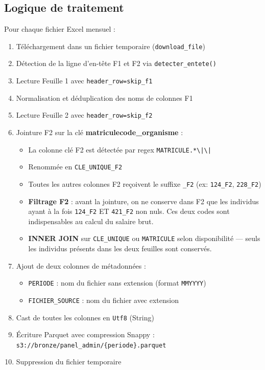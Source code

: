 \documentclass[12pt,a4paper,french]{report}
\newcommand{\bucket}[1]{\texttt{s3://#1}}
\newcommand{\colname}[1]{\texttt{#1}}
\begin{document}
\subsection{Logique de traitement}

Pour chaque fichier Excel mensuel :

\begin{enumerate}
  \item Téléchargement dans un fichier temporaire (\texttt{download\_file})
  \item Détection de la ligne d'en-tête F1 et F2 via
        \texttt{detecter\_entete()}
  \item Lecture Feuille 1 avec \texttt{header\_row=skip\_f1}
  \item Normalisation et déduplication des noms de colonnes F1
  \item Lecture Feuille 2 avec \texttt{header\_row=skip\_f2}
  \item Jointure F2 sur la clé \textbf{matricule\textbar\textbar{}code\_organisme} :
    \begin{itemize}[nosep]
      \item La colonne clé F2 est détectée par regex
            \texttt{MATRICULE.*\textbackslash|\textbackslash|}
      \item Renommée en \texttt{CLE\_UNIQUE\_F2}
      \item Toutes les autres colonnes F2 reçoivent le suffixe
            \texttt{\_F2} (ex: \texttt{124\_F2}, \texttt{228\_F2})
      \item \textbf{Filtrage F2} : avant la jointure, on ne conserve dans F2
            que les individus ayant à la fois \texttt{124\_F2} ET \texttt{421\_F2}
            non nuls. Ces deux codes sont indispensables au calcul du salaire brut.
      \item \textbf{INNER JOIN} sur \texttt{CLE\_UNIQUE} ou
            \texttt{MATRICULE} selon disponibilité --- seuls les individus présents
            dans les deux feuilles sont conservés.
    \end{itemize}
  \item Ajout de deux colonnes de métadonnées :
    \begin{itemize}[nosep]
      \item \colname{PERIODE} : nom du fichier sans extension
            (format \texttt{MMYYYY})
      \item \colname{FICHIER\_SOURCE} : nom du fichier avec extension
    \end{itemize}
  \item Cast de toutes les colonnes en \texttt{Utf8} (String)
  \item Écriture Parquet avec compression Snappy :
        \bucket{bronze/panel\_admin/\{periode\}.parquet}
  \item Suppression du fichier temporaire
\end{enumerate}
\end{document}
